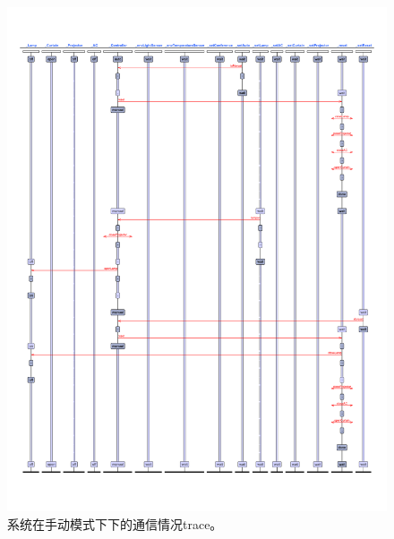 \documentclass[journal, a4paper]{IEEEtran}
\begin{document}
\begin{figure}
    \centering
    \includegraphics[width=\columnwidth]{images/run3.pdf}
    \caption{系统在手动模式下下的通信情况trace。}
    \label{figure:run3}
\end{figure}

\end{document}
